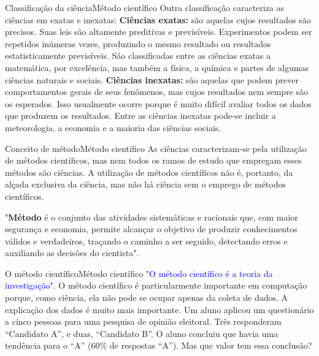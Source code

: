 \documentclass[t]{beamer}
\begin{document}
\begin{ftst}{Classificação da ciência}{Método científico}
\justifying
Outra classificação caracteriza as ciências em exatas e inexatas:
\vone
\textbf{Ciências exatas:} são aquelas cujos resultados são precisos. Suas leis são altamente preditivas e previsíveis. Experimentos podem ser repetidos inúmeras vezes, produzindo o mesmo resultado ou resultados estatisticamente previsíveis. São classificadas entre as ciências exatas a matemática, por excelência, mas também a física, a química e partes de algumas ciências naturais e sociais.
\vone
\textbf{Ciências inexatas:}  são aquelas que podem prever comportamentos gerais de seus fenômenos, mas cujos resultados nem sempre são os esperados. Isso usualmente ocorre porque é muito difícil avaliar todos os dados que produzem os resultados. Entre as ciências inexatas pode-se incluir a meteorologia, a economia e a maioria das ciências sociais.

\end{ftst}





\begin{ftst}{Conceito de método}{Método científico}
\vone
\justifying
As ciências caracterizam-se pela utilização de métodos científicos, mas nem todos os ramos de estudo que empregam esses métodos são ciências. A utilização de métodos científicos não é, portanto, da alçada exclusiva da ciência, mas não há ciência sem o emprego de métodos científicos.\\ \vone

"\textbf{Método} é o conjunto das atividades sistemáticas e racionais que, com maior segurança e economia, permite alcançar o objetivo de produzir conhecimentos válidos e verdadeiros, traçando o caminho a ser seguido, detectando erros e auxiliando as decisões do cientista".

\end{ftst}


\begin{ftst}{O método científico}{Método científico}
\justifying
\textcolor{blue}{"O método científico é a teoria da investigação".}
\vone
O método científico é particularmente importante em computação porque, como ciência, ela não pode se ocupar apenas da coleta de dados. A explicação dos dados é muito mais importante.
\vone
\footnotesize
Um aluno aplicou um questionário a cinco pessoas para uma pesquisa de opinião eleitoral. Três responderam “Candidato A”, e duas, “Candidato B”. O aluno concluiu que
havia uma tendência para o “A” (60\% de respostas “A”). Mas que valor tem essa conclusão? 

\end{ftst}
\end{document}
